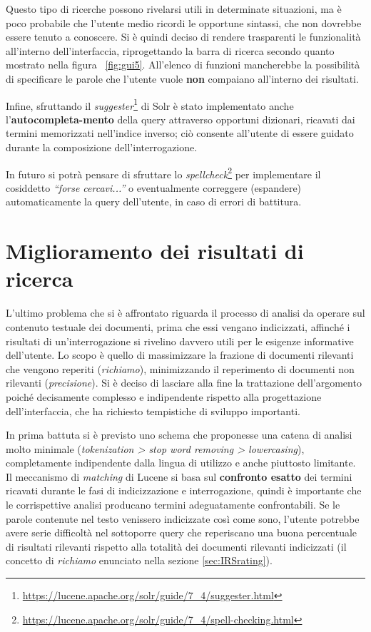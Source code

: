 Questo tipo di ricerche possono rivelarsi utili in determinate situazioni, ma è poco probabile che l’utente medio ricordi le opportune sintassi, che non dovrebbe essere tenuto a conoscere. Si è quindi deciso di rendere trasparenti le funzionalità all’interno dell’interfaccia, riprogettando la barra di ricerca secondo quanto mostrato nella figura ~\ref{fig:gui5}. All’elenco di funzioni mancherebbe la possibilità di specificare le parole che l’utente vuole \textbf{non} compaiano all’interno dei risultati.

\vspace{1em}

Infine, sfruttando il \textit{suggester}\footnote{\url{https://lucene.apache.org/solr/guide/7_4/suggester.html}} di Solr è stato implementato anche l’\textbf{autocompleta-mento} della query attraverso opportuni dizionari, ricavati dai termini memorizzati nell’indice inverso; ciò consente all’utente di essere guidato durante la composizione dell’interrogazione.

In futuro si potrà pensare di sfruttare lo \textit{spellcheck}\footnote{\url{https://lucene.apache.org/solr/guide/7_4/spell-checking.html}}  per implementare il cosiddetto \textit{“forse cercavi...”} o eventualmente correggere (espandere) automaticamente la query dell’utente, in caso di errori di battitura.




\section{Miglioramento dei risultati di ricerca}

L’ultimo problema che si è affrontato riguarda il processo di analisi da operare sul contenuto testuale dei documenti, prima che essi vengano indicizzati, affinché i risultati di un’interrogazione si rivelino davvero utili per le esigenze informative dell’utente. Lo scopo è quello di massimizzare la frazione di documenti rilevanti che vengono reperiti (\textit{richiamo}), minimizzando il reperimento di documenti non rilevanti (\textit{precisione}). Si è deciso di lasciare alla fine la trattazione dell’argomento poiché decisamente complesso e indipendente rispetto alla progettazione dell’interfaccia, che ha richiesto tempistiche di sviluppo importanti.

\vspace{1em}

In prima battuta si è previsto uno schema che proponesse una catena di analisi molto minimale (\textit{tokenization > stop word removing > lowercasing}), completamente indipendente dalla lingua di utilizzo e anche piuttosto limitante. Il meccanismo di \textit{matching} di Lucene si basa sul \textbf{confronto esatto} dei termini ricavati durante le fasi di indicizzazione e interrogazione, quindi è importante che le corrispettive analisi producano termini adeguatamente confrontabili. Se le parole contenute nel testo venissero indicizzate così come sono, l’utente potrebbe avere serie difficoltà nel sottoporre query che reperiscano una buona percentuale di risultati rilevanti rispetto alla totalità dei documenti rilevanti indicizzati (il concetto di \textit{richiamo} enunciato nella sezione \ref{sec:IRSrating}).

